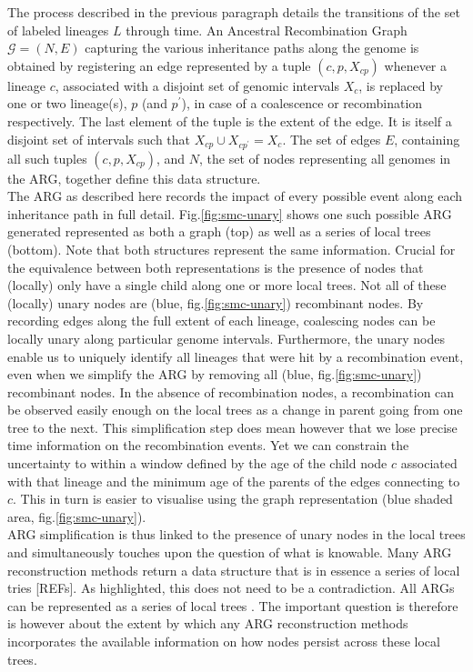 \documentclass{article}
\begin{document}
The process described in the previous paragraph details the transitions of the 
set of labeled lineages $L$ through time. An Ancestral Recombination Graph 
$\mathcal{G} = (N, E)$ capturing the various inheritance paths along the genome 
is obtained by registering an edge represented by a tuple $(c, p, X_{cp})$ 
whenever a lineage $c$, associated with a disjoint set of genomic intervals $X_c$, is 
replaced by one or two lineage(s), $p$ (and $p^{\prime}$), 
in case of a coalescence or recombination respectively.
The last element of the tuple is the extent of the edge. It is itself a  
disjoint set of intervals such that $X_{cp} \cup X_{cp^{\prime}} = X_c$. 
The set of edges $E$, containing all such tuples $(c, p, X_{cp})$, 
and $N$, the set of nodes representing all genomes in the ARG, together
define this data structure.\\

The ARG as described here records the impact of every possible event along each 
inheritance path in full detail. Fig.\ref{fig:smc-unary} shows one such possible 
ARG generated represented 
as both a graph (top) as well as a series of local trees (bottom). 
Note that both structures represent the same information. 
Crucial for the equivalence between both representations is the presence of
nodes that (locally) only have a single child along one or more local 
trees. Not all of these (locally) unary nodes are 
(blue, fig.\ref{fig:smc-unary}) recombinant nodes. By recording edges along 
the full extent of each lineage, coalescing nodes can be locally unary 
along particular genome intervals. Furthermore, the unary nodes enable 
us to uniquely identify all lineages that were hit by a recombination 
event, even when we simplify the ARG by removing all 
(blue, fig.\ref{fig:smc-unary}) recombinant nodes. 
In the absence of recombination nodes, a recombination can be observed 
easily enough on the local trees as a change in parent going from 
one tree to the next. This simplification step 
does mean however that we lose precise time information on the 
recombination events. Yet we can constrain the uncertainty to 
within a window defined by the age of the child node $c$ associated 
with that lineage and the minimum age of the parents of the 
edges connecting to $c$. This in turn is easier to visualise using the 
graph representation (blue shaded area, fig.\ref{fig:smc-unary}).\\

ARG simplification is thus linked to the presence of unary nodes in 
the local trees and simultaneously touches upon the question of what is 
knowable. Many ARG reconstruction methods return a data structure that 
is in essence a series of local tries [REFs]. 
As highlighted, this does not need to be a contradiction. 
All ARGs can be represented as a series of local trees \citep{wong-2023}.
The important question is therefore is however about the extent by which any 
ARG reconstruction methods incorporates the available information 
on how nodes persist across these local trees.\\ 
\end{document}
